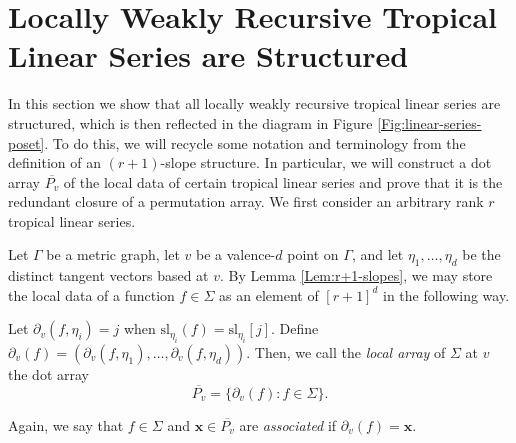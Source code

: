\documentclass{amsart}
\begin{document}
	\section{Locally Weakly Recursive Tropical Linear Series are Structured}
	\label{Sec:LWRTLS-are-structured}
	
	In this section we show that all locally weakly recursive tropical linear series are structured, which is then reflected in the diagram in Figure \ref{Fig:linear-series-poset}. To do this, we will recycle some notation and terminology from the definition of an $(r+1)$-slope structure. In particular, we will construct a dot array $\overline{P_v}$ of the local data of certain tropical linear series and prove that it is the redundant closure of a permutation array. We first consider an arbitrary rank $r$ tropical linear series.
	
	Let $\Gamma$ be a metric graph, let $v$ be a valence-$d$ point on $\Gamma$, and let $\eta_1, \ldots, \eta_d$ be the distinct tangent vectors based at $v$. By Lemma \ref{Lem:r+1-slopes}, we may store the local data of a function $f \in \Sigma$ as an element of $[r+1]^d$ in the following way.
	
	Let $\partial_v(f,\eta_i) = j$ when $\mathrm{sl}_{\eta_i}(f) = \mathrm{sl}_{\eta_i}[j]$. Define $\partial_v(f) = (\partial_v(f,\eta_1), \ldots, \partial_v(f,\eta_d))$. Then, we call the \textit{local array} of $\Sigma$ at $v$ the dot array $$\overline{P_v} = \{ \partial_v(f) : f \in \Sigma \}.$$
	
	Again, we say that $f \in \Sigma$ and $\mathbf{x} \in \overline{P_v}$ are \textit{associated} if $\partial_{v}(f) = \mathbf{x}$.
	
\end{document}
